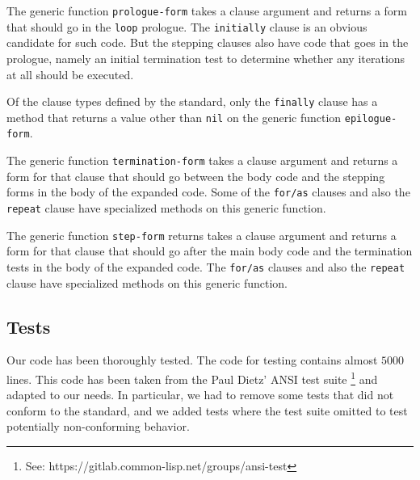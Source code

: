 The generic function \texttt{prologue-form} takes a clause argument
and returns a form that should go in the \texttt{loop} prologue.  The
\texttt{initially} clause is an obvious candidate for such code.  But
the stepping clauses also have code that goes in the prologue, namely
an initial termination test to determine whether any iterations at all
should be executed.

Of the clause types defined by the \commonlisp{} standard, only the
\texttt{finally} clause has a method that returns a value other than
\texttt{nil} on the generic function \texttt{epilogue-form}.

The generic function \texttt{termination-form} takes a clause argument
and returns a form for that clause that should go between the body
code and the stepping forms in the body of the expanded code.  Some of
the \texttt{for/as} clauses and also the \texttt{repeat} clause have
specialized methods on this generic function.

The generic function \texttt{step-form} returns takes a clause
argument and returns a form for that clause that should go after the
main body code and the termination tests in the body of the expanded
code.  The \texttt{for/as} clauses and also the \texttt{repeat} clause
have specialized methods on this generic function.

\subsection{Tests}
\label{sec-our-technique-tests}

Our code has been thoroughly tested.  The code for testing contains
almost $5000$ lines.  This code has been taken from the Paul Dietz'
ANSI test suite%
\footnote{See: https://gitlab.common-lisp.net/groups/ansi-test}
and adapted to our needs.  In particular, we had to remove some tests
that did not conform to the standard, and we added tests where the
test suite omitted to test potentially non-conforming behavior.
